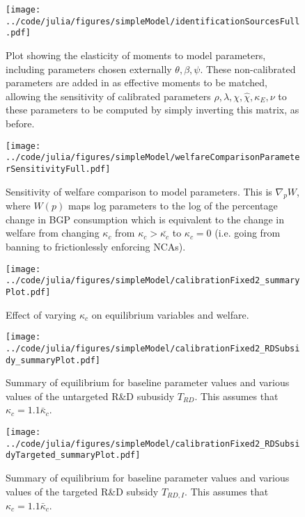\documentclass[ecta,nameyear,final]{econsocart}
\theoremstyle{definition}
\begin{document}
\begin{figure}[]
	\centering
	\texttt{[image: ../code/julia/figures/simpleModel/identificationSourcesFull.pdf]}
	\caption{Plot showing the elasticity of moments to model parameters, including parameters chosen externally $\theta , \beta, \psi$. These non-calibrated parameters are added in as effective moments to be matched, allowing the sensitivity of calibrated parameters $\rho, \lambda, \chi, \hat{\chi}, \kappa_E, \nu$ to these parameters to be computed by simply inverting this matrix, as before.}
	\label{calibration_identificationSources_full}
\end{figure}

\begin{figure}[]
	\centering
	\texttt{[image: ../code/julia/figures/simpleModel/welfareComparisonParameterSensitivityFull.pdf]}
	\caption{Sensitivity of welfare comparison to model parameters. This is $\nabla_p W$, where $W(p)$ maps log parameters to the log of the percentage change in BGP consumption which is equivalent to the change in welfare from changing $\kappa_c$ from $\kappa_c > \bar{\kappa_c}$ to $\kappa_c = 0$ (i.e. going from banning to frictionlessly enforcing NCAs).}
	\label{welfareComparisonParameterSensitivityFull}
\end{figure}

\begin{figure}[]
	\centering
	\texttt{[image: ../code/julia/figures/simpleModel/calibrationFixed2\_summaryPlot.pdf]}
	\caption{Effect of varying $\kappa_c$ on equilibrium variables and welfare.}
	\label{calibration_summaryPlot}
\end{figure}

\begin{figure}[]
	\centering
	\texttt{[image: ../code/julia/figures/simpleModel/calibrationFixed2\_RDSubsidy\_summaryPlot.pdf]}
	\caption{Summary of equilibrium for baseline parameter values and various values of the untargeted R\&D subusidy $T_{RD}$. This assumes that $\kappa_c = 1.1 \bar{\kappa}_c$.}
	\label{calibration_RDSubsidy_summaryPlot}
\end{figure}

\begin{figure}[]
	\centering
	\texttt{[image: ../code/julia/figures/simpleModel/calibrationFixed2\_RDSubsidyTargeted\_summaryPlot.pdf]}
	\caption{Summary of equilibrium for baseline parameter values and various values of the targeted R\&D subsidy $T_{RD,I}$. This assumes that $\kappa_c = 1.1 \bar{\kappa}_c$.}
	\label{calibration_RDSubsidyTargeted_summaryPlot}
\end{figure}
\end{document}
